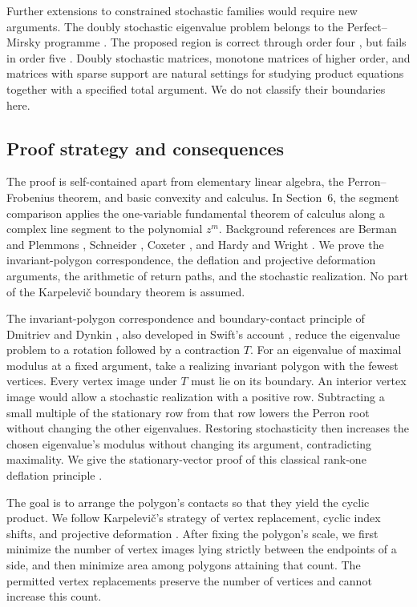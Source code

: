 \documentclass[11pt,a4paper]{article}
\theoremstyle{definition}
\theoremstyle{remark}
\numberwithin{equation}{section}
\begin{document}
Further extensions to constrained stochastic families would require new arguments. The doubly stochastic eigenvalue problem belongs to the Perfect--Mirsky programme \cite{PerfectMirsky}. The proposed region is correct through order four \cite{LevickPereiraKribs}, but fails in order five \cite{HarlevJohnsonLim}. Doubly stochastic matrices, monotone matrices of higher order, and matrices with sparse support are natural settings for studying product equations together with a specified total argument. We do not classify their boundaries here.

\subsection*{Proof strategy and consequences}

The proof is self-contained apart from elementary linear algebra, the Perron--Frobenius theorem, and basic convexity and calculus. In Section~6, the segment comparison applies the one-variable fundamental theorem of calculus along a complex line segment to the polynomial $z^m$. Background references are Berman and Plemmons \cite{BermanPlemmons}, Schneider \cite{Schneider}, Coxeter \cite{Coxeter}, and Hardy and Wright \cite{HardyWright}. We prove the invariant-polygon correspondence, the deflation and projective deformation arguments, the arithmetic of return paths, and the stochastic realization. No part of the Karpelevi\v{c} boundary theorem is assumed.

The invariant-polygon correspondence and boundary-contact principle of Dmitriev and Dynkin \cite{DD}, also developed in Swift's account \cite{Swift}, reduce the eigenvalue problem to a rotation followed by a contraction $T$. For an eigenvalue of maximal modulus at a fixed argument, take a realizing invariant polygon with the fewest vertices. Every vertex image under $T$ must lie on its boundary. An interior vertex image would allow a stochastic realization with a positive row. Subtracting a small multiple of the stationary row from that row lowers the Perron root without changing the other eigenvalues. Restoring stochasticity then increases the chosen eigenvalue's modulus without changing its argument, contradicting maximality. We give the stationary-vector proof of this classical rank-one deflation principle \cite{Brauer,Goddard}.

The goal is to arrange the polygon's contacts so that they yield the cyclic product. We follow Karpelevi\v{c}'s strategy of vertex replacement, cyclic index shifts, and projective deformation \cite{Karp}. After fixing the polygon's scale, we first minimize the number of vertex images lying strictly between the endpoints of a side, and then minimize area among polygons attaining that count. The permitted vertex replacements preserve the number of vertices and cannot increase this count.
\end{document}
